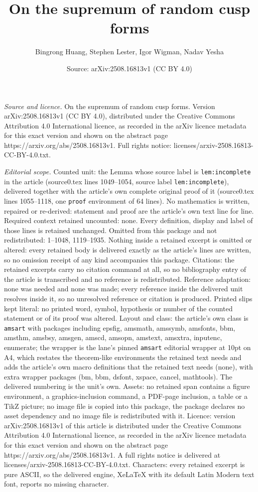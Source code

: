 \documentclass[10pt,a4paper]{amsart}
\title[On the supremum of random cusp forms]{On the supremum of random cusp forms}
\author{Bingrong Huang, Stephen Lester, Igor Wigman, Nadav Yesha}
\date{Source: arXiv:2508.16813v1 (CC BY 4.0)}
\begin{document}
\maketitle

\noindent\emph{Source and licence.} On the supremum of random cusp forms. Version arXiv:2508.16813v1 (CC BY 4.0), distributed under the Creative Commons Attribution 4.0 International licence, as recorded in the arXiv licence metadata for this exact version and shown on the abstract page https://arxiv.org/abs/2508.16813v1. Full rights notice: licenses/arxiv-2508.16813-CC-BY-4.0.txt.\par\smallskip

\noindent\textit{Editorial scope.} Counted unit: the Lemma whose source label is \texttt{lem:incomplete} in the article (source0.tex lines 1049--1054, source label \texttt{lem:incomplete}), delivered together with the article's own complete original proof of it (source0.tex lines 1055--1118, one \texttt{proof} environment of 64 lines). No mathematics is written, repaired or re-derived: statement and proof are the article's own text line for line. Required context retained uncounted: none. Every definition, display and label of those lines is retained unchanged. Omitted from this package and not redistributed: 1--1048, 1119--1935. Nothing inside a retained excerpt is omitted or altered: every retained body is delivered exactly as the article's lines are written, so no omission receipt of any kind accompanies this package. Citations: the retained excerpts carry no citation command at all, so no bibliography entry of the article is transcribed and no reference is redistributed. Reference adaptation: none was needed and none was made; every reference inside the delivered unit resolves inside it, so no unresolved reference or citation is produced. Printed slips kept literal: no printed word, symbol, hypothesis or number of the counted statement or of its proof was altered. Layout and class: the article's own class is \texttt{amsart} with packages including epsfig, amsmath, amssymb, amsfonts, bbm, amsthm, amsbsy, amsgen, amscd, amsopn, amstext, amsxtra, inputenc, enumerate; the wrapper is the lane's pinned \texttt{amsart} editorial wrapper at 10pt on A4, which restates the theorem-like environments the retained text needs and adds the article's own macro definitions that the retained text needs (none), with extra wrapper packages (bm, bbm, dsfont, xspace, cancel, mathtools). The delivered numbering is the unit's own. Assets: no retained span contains a figure environment, a graphics-inclusion command, a PDF-page inclusion, a table or a TikZ picture; no image file is copied into this package, the package declares no asset dependency and no image file is redistributed with it. Licence: version arXiv:2508.16813v1 of this article is distributed under the Creative Commons Attribution 4.0 International licence, as recorded in the arXiv licence metadata for this exact version and shown on the abstract page https://arxiv.org/abs/2508.16813v1. A full rights notice is delivered at licenses/arxiv-2508.16813-CC-BY-4.0.txt. Characters: every retained excerpt is pure ASCII, so the delivered engine, XeLaTeX with its default Latin Modern text font, reports no missing character.
\end{document}
